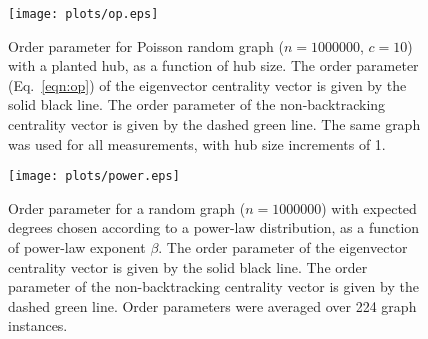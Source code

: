 \documentclass[twocolumn,prl,superscriptaddress]{revtex4}
\newcommand\colora{black }
\newcommand\colorb{green }
\begin{document}
\begin{figure}
\begin{center}
\texttt{[image: plots/op.eps]}
\end{center}
\caption{Order parameter for Poisson random graph ($n=1000000$, $c=10$) with a planted hub, as a function of hub size. The order parameter (Eq.~\eqref{eqn:op}) of the eigenvector centrality vector is given by the solid \colora line. The order parameter of the non-backtracking centrality vector is given by the dashed \colorb line. The same graph was used for all measurements, with hub size increments of 1.}
\label{fig:order-parameter}
\end{figure}

\begin{figure}
\begin{center}
\texttt{[image: plots/power.eps]}
\end{center}
\caption{Order parameter for a random graph ($n=1000000$) with expected degrees chosen according to a power-law distribution, as a function of power-law exponent $\beta$. The order parameter of the eigenvector centrality vector is given by the solid \colora line. The order parameter of the non-backtracking centrality vector is given by the dashed \colorb line. Order parameters were averaged over 224 graph instances.} %
\label{fig:power-law}
\end{figure}
\end{document}

